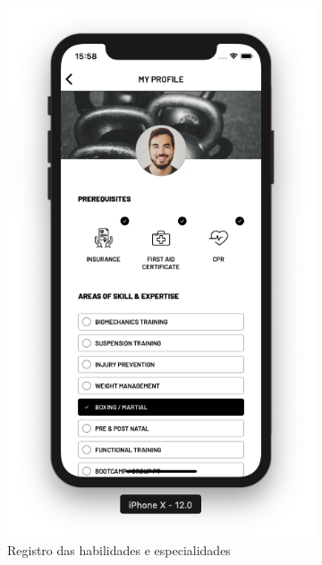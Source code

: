 \begin{figure}[H]
\begin{subfigure}[b]{0.3\textwidth}
        \includegraphics[width=\textwidth]{pfc/figuras/tr-register-profile-2.png}
        \caption{Registro das habilidades e especialidades}
        \label{fig:register-tr-skills}
    \end{subfigure}
    ~
    \begin{subfigure}[b]{0.3\textwidth}

\end{subfigure}
\end{figure}
